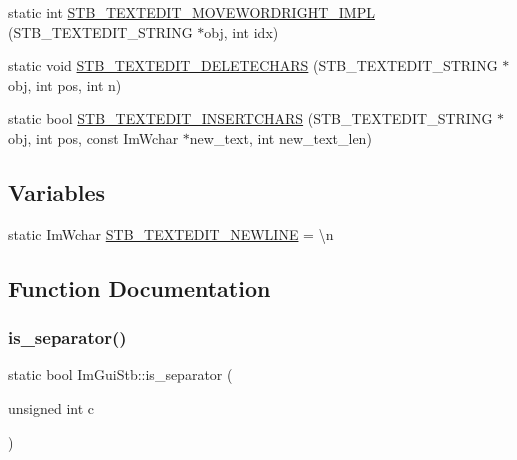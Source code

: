 \begin{DoxyCompactItemize}
\item 
static int \mbox{\hyperlink{namespace_im_gui_stb_aadcf517e756dd59dd6da5502f38a836e}{S\+T\+B\+\_\+\+T\+E\+X\+T\+E\+D\+I\+T\+\_\+\+M\+O\+V\+E\+W\+O\+R\+D\+R\+I\+G\+H\+T\+\_\+\+I\+M\+PL}} (S\+T\+B\+\_\+\+T\+E\+X\+T\+E\+D\+I\+T\+\_\+\+S\+T\+R\+I\+NG $\ast$obj, int idx)
\item 
static void \mbox{\hyperlink{namespace_im_gui_stb_aa8e93b4c0311ac9f020fdd26d2652596}{S\+T\+B\+\_\+\+T\+E\+X\+T\+E\+D\+I\+T\+\_\+\+D\+E\+L\+E\+T\+E\+C\+H\+A\+RS}} (S\+T\+B\+\_\+\+T\+E\+X\+T\+E\+D\+I\+T\+\_\+\+S\+T\+R\+I\+NG $\ast$obj, int pos, int n)
\item 
static bool \mbox{\hyperlink{namespace_im_gui_stb_a10283229431fcccabb9a345a672ef9fb}{S\+T\+B\+\_\+\+T\+E\+X\+T\+E\+D\+I\+T\+\_\+\+I\+N\+S\+E\+R\+T\+C\+H\+A\+RS}} (S\+T\+B\+\_\+\+T\+E\+X\+T\+E\+D\+I\+T\+\_\+\+S\+T\+R\+I\+NG $\ast$obj, int pos, const Im\+Wchar $\ast$new\+\_\+text, int new\+\_\+text\+\_\+len)
\end{DoxyCompactItemize}
\subsection*{Variables}
\begin{DoxyCompactItemize}
\item 
static Im\+Wchar \mbox{\hyperlink{namespace_im_gui_stb_acb6d30da021dbff933ce94ce9ea738ac}{S\+T\+B\+\_\+\+T\+E\+X\+T\+E\+D\+I\+T\+\_\+\+N\+E\+W\+L\+I\+NE}} = \textquotesingle{}\textbackslash{}n\textquotesingle{}
\end{DoxyCompactItemize}


\subsection{Function Documentation}
\mbox{\label{namespace_im_gui_stb_ada7de5d22e36a0bb17592c27dbafc02d}} 
\subsubsection{\texorpdfstring{is\+\_\+separator()}{is\_separator()}}
{\footnotesize\ttfamily static bool Im\+Gui\+Stb\+::is\+\_\+separator (\begin{DoxyParamCaption}\item[{unsigned int}]{c }\end{DoxyParamCaption})\hspace{0.3cm}{\ttfamily [static]}}

